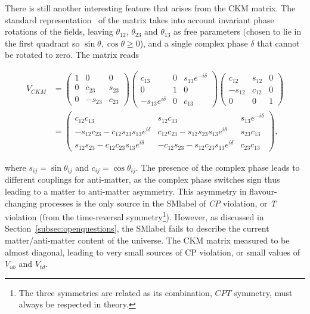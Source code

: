 There is still another interesting feature that arises from the CKM matrix. The standard representation~\cite{Ling-Lie} of the matrix takes into account invariant phase rotations of the fields, leaving $\theta_{12}$, $\theta_{23}$ and $\theta_{13}$ as free parameters (chosen to lie in the first quadrant so $\sin\theta,\cos\theta\geq0$), and a single complex phase $\delta$ that cannot be rotated to zero. The matrix reads

\begin{equation}
\begin{split}
    V_{CKM} &= \begin{pmatrix} 1 & 0 & 0 \\ 0 & c_{23} & s_{23} \\ 0 & -s_{23} & c_{23} \end{pmatrix} \begin{pmatrix} c_{13} & 0 & s_{13}e^{-i\delta} \\ 0 & 1 & 0 \\ -s_{13}e^{i\delta} & 0 & c_{13} \end{pmatrix}
    \begin{pmatrix} c_{12} & s_{12} & 0 \\ -s_{12} & c_{12} & 0 \\ 0 & 0 & 1 \end{pmatrix} \\ 
    &= \begin{pmatrix} c_{12}c_{13} & s_{12}c_{13} & s_{13}e^{-i\delta} \\ -s_{12}c_{23}-c_{12}s_{23}s_{13}e^{i\delta} & c_{12}c_{23}-s_{12}s_{23}s_{13}e^{i\delta} & s_{23}c_{13} \\ s_{12}s_{23}-c_{12}c_{23}s_{13}e^{i\delta} & -c_{12}s_{23}-s_{12}c_{23}s_{13}e^{i\delta} & c_{23}c_{13} \end{pmatrix},
\end{split}
\end{equation}

where $s_{ij}=\sin\theta_{ij}$ and $c_{ij}=\cos\theta_{ij}$. The presence of the complex phase leads to different couplings for anti-matter, as the complex phase switches sign thus leading to a matter to anti-matter asymmetry. This asymmetry in flavour-changing processes is the only source in the \acrshort{SMlabel} of \textit{CP} violation, or \textit{T} violation (from the time-reversal symmetry\footnote{The three symmetries are related as its combination, $CPT$ symmetry, must always be respected in theory.}). However, as discussed in Section~\ref{subsec:openquestions}, the \acrshort{SMlabel} fails to describe the current matter/anti-matter content of the universe. The CKM matrix measured to be almost diagonal, leading to very small sources of CP violation, or small values of $V_{ub}$ and $V_{td}$.\\

